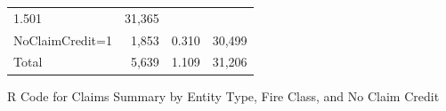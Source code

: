\documentclass[]{book}
\begin{document}
\begin{longtable}[]{@{}lrrr@{}}
\begin{minipage}[t]{0.15\columnwidth}
1.501\strut
\end{minipage} & \begin{minipage}[t]{0.15\columnwidth}\raggedleft\strut
31,365\strut
\end{minipage}\tabularnewline
\begin{minipage}[t]{0.27\columnwidth}\raggedright\strut
NoClaimCredit=1\strut
\end{minipage} & \begin{minipage}[t]{0.15\columnwidth}\raggedleft\strut
1,853\strut
\end{minipage} & \begin{minipage}[t]{0.15\columnwidth}\raggedleft\strut
0.310\strut
\end{minipage} & \begin{minipage}[t]{0.15\columnwidth}\raggedleft\strut
30,499\strut
\end{minipage}\tabularnewline
\begin{minipage}[t]{0.27\columnwidth}\raggedright\strut
Total\strut
\end{minipage} & \begin{minipage}[t]{0.15\columnwidth}\raggedleft\strut
5,639\strut
\end{minipage} & \begin{minipage}[t]{0.15\columnwidth}\raggedleft\strut
1.109\strut
\end{minipage} & \begin{minipage}[t]{0.15\columnwidth}\raggedleft\strut
31,206\strut
\end{minipage}\tabularnewline
\bottomrule
\end{longtable}

R Code for Claims Summary by Entity Type, Fire Class, and No Claim
Credit
\end{document}
